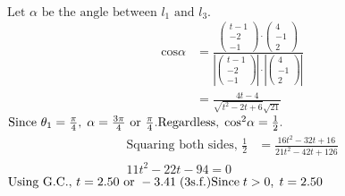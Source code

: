\documentclass[12pt, a4 paper]{article}
\begin{document}
\begin{outline}[enumerate]
\begin{align*}
					\end{align*}
					${\textrm{Let }}\alpha {\textrm{ be the angle between }}{l_1}{\textrm{ and }}{l_3}.$
					\begin{align*}
						{\textrm{cos}}\alpha & = \frac{{\left( {\begin{array}{*{20}{c}}{t - 1} \\{ - 2}\\{ - 1}\end{array}} \right) \cdot \left( {\begin{array}{*{20}{c}}4\\{ - 1}\\2\end{array}} \right)}}{{\left| {\left( {\begin{array}{*{20}{c}}{t - 1}\\{ - 2}\\{ - 1}\end{array}} \right)} \right| \cdot \left| {\left( {\begin{array}{*{20}{c}}4\\{ - 1}\\2\end{array}} \right)} \right|}}\\ &= \frac{{4t - 4}}{{\sqrt {{t^2} - 2t + 6} \sqrt {21} }}
					\end{align*}
					$
					{\textrm{Since }}{\theta _1} = \frac{\pi }{4},\;\alpha  = \frac{{3\pi }}{4}{\textrm{ or }}\frac{\pi }{4}.\\
					{\textrm{Regardless}},\;{\cos ^2}\alpha  = \frac{1}{2}.$
					\begin{align*}
						{\textrm{Squaring both sides, }}\frac{1}{2} & = \frac{{16{t^2} - 32t + 16}}{{21{t^2} - 42t + 126}} \\11{t^2} - 22t - 94 = 0
					\end{align*}
					${\textrm{Using G}}{\textrm{.C}}{\textrm{., }}t = 2.50{\textrm{ or }} - 3.41\;({\textrm{3s}}{\textrm{.f}}{\textrm{.)}}\\
					{\textrm{Since}}\;t > 0,\;t = 2.50$


\end{outline}
\end{document}
